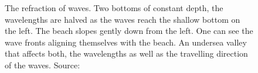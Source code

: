 \begin{figure}
 \centering
 \hfill
 \hfill
 \caption{The refraction of waves.
 Two bottoms of constant depth, the
wavelengths are halved as the waves reach the shallow bottom on the left.
 The beach slopes gently down from
the left. One can see the wave fronts aligning themselves with the beach.
 An undersea valley that affects
both, the wavelengths as well as the travelling direction of the waves.
Source:~\cite{Fournier:1986}}
\label{fig:fournier1986:refraction}
\end{figure}
%


